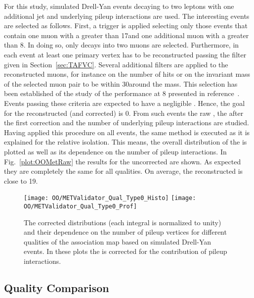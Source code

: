 For this study, simulated Drell-Yan events decaying to two leptons with one additional jet and underlying pileup interactions are used. The interesting events are selected as follows. First, a trigger is applied selecting only those events that contain one muon with a \pt greater than 17\GeV and one additional muon with a \pt greater than 8\GeV. In doing so, only decays into two muons are selected. Furthermore, in each event at least one primary vertex has to be reconstructed passing the filter given in Section~\ref{sec:TAFVC}. Several additional filters are applied to the reconstructed muons, for instance on the number of hits or on the invariant mass of the selected muon pair to be within 30\GeV around the \Zz mass. This selection has been established of the study of the \MET{} performance at 8\TeV{} presented in reference~. Events passing these criteria are expected to have a negligible \MET{}. Hence, the goal for the reconstructed (and corrected) \MET{} is 0\GeV{}. From such events the raw \MET{}, the \MET{} after the first correction and the number of underlying pileup interactions are studied. Having applied this procedure on all events, the same method is executed as it is explained for the relative isolation. This means, the overall distribution of the \MET{} is plotted as well as its dependence on the number of pileup interactions. In Fig.~\ref{plot:OOMetRaw} the results for the uncorrected \MET{} are shown. As expected they are completely the same for all qualities. On average, the reconstructed \MET{} is close to 19\GeV.

\begin{figure}[Ht]
    \centering
    \texttt{[image: OO/METValidator\_Qual\_Type0\_Histo]}
    \texttt{[image: OO/METValidator\_Qual\_Type0\_Prof]}
    \caption[The corrected \MET{} distribution and its dependence on the number of pileup vertices for different association qualities based on simulated Drell-Yan events]{The corrected \MET{} distributions (each integral is normalized to unity) and their dependence on the number of pileup vertices for different qualities of the association map based on simulated Drell-Yan events. In these plots the \MET{} is corrected for the contribution of pileup interactions. \label{plot:OOMetQual}}
\end{figure}

\subsection{Quality Comparison \label{sec:OOMetQual}}

